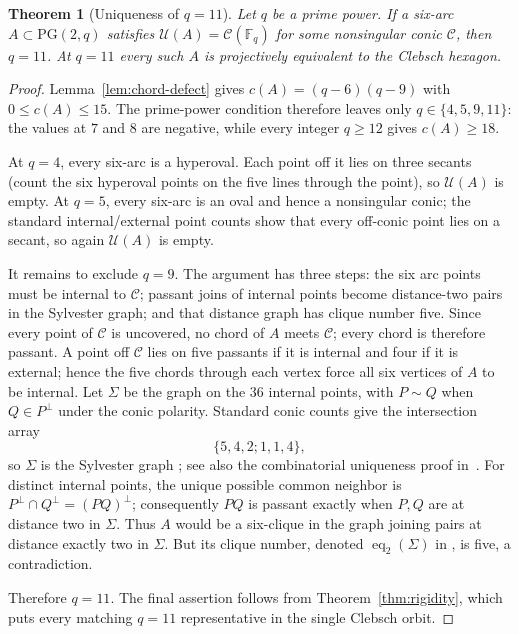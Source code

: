 \documentclass[11pt]{article}
\newtheorem{theorem}{Theorem}[section]
\theoremstyle{definition}
\theoremstyle{remark}
\newcommand{\PG}{\mathrm{PG}}
\newcommand{\F}{\mathbb{F}}
\newcommand{\cC}{\mathcal{C}}
\newcommand{\cU}{\mathcal{U}}
\begin{document}
\begin{theorem}[Uniqueness of $q=11$]
\label{thm:why11}
Let $q$ be a prime power. If a six-arc $A\subset\PG(2,q)$ satisfies
$\cU(A)=\cC(\F_q)$ for some nonsingular conic $\cC$, then $q=11$.
At $q=11$ every such $A$ is projectively equivalent to the
Clebsch hexagon.
\end{theorem}

\begin{proof}
Lemma~\ref{lem:chord-defect} gives
$c(A)=(q-6)(q-9)$ with $0\le c(A)\le15$. The prime-power condition therefore
leaves only $q\in\{4,5,9,11\}$: the values at $7$ and $8$ are negative,
while every integer $q\ge12$ gives $c(A)\ge18$.

At $q=4$, every six-arc is a hyperoval. Each point off it lies on three
secants (count the six hyperoval points on the five lines through the
point), so $\cU(A)$ is empty. At $q=5$, every six-arc is an oval and hence a
nonsingular conic; the standard internal/external point counts show that
every off-conic point lies on a secant, so again $\cU(A)$ is empty.

It remains to exclude $q=9$. The argument has three steps: the six arc
points must be internal to $\cC$; passant joins of internal points become
distance-two pairs in the Sylvester graph; and that distance graph has
clique number five. Since every point of $\cC$ is uncovered, no chord of
$A$ meets $\cC$; every chord is therefore passant. A point off $\cC$ lies on five passants if it
is internal and four if it is external; hence the five chords through each
vertex force all six vertices of $A$ to be internal. Let $\Sigma$ be the graph
on the $36$ internal points, with $P\sim Q$ when $Q\in P^\perp$ under the
conic polarity. Standard conic counts give the intersection array
\[
 \{5,4,2;1,1,4\},
\]
so $\Sigma$ is the Sylvester graph
\cite[\S13.1.2]{BrouwerCohenNeumaier1989}; see also the combinatorial
uniqueness proof in~\cite[Thm.~6]{JurisicVidali2019}. For distinct internal
points, the unique possible common neighbor is
$P^\perp\cap Q^\perp=(PQ)^\perp$; consequently $PQ$ is passant exactly when
$P,Q$ are at distance two in $\Sigma$. Thus $A$ would be a six-clique in the
graph joining pairs at distance exactly two in $\Sigma$. But its clique number, denoted
$\operatorname{eq}_2(\Sigma)$ in
\cite[Table~1]{AbiadJabalAmeliReijnders2025}, is five, a contradiction.

Therefore $q=11$. The final assertion follows from
Theorem~\ref{thm:rigidity}, which puts every matching $q=11$ representative
in the single Clebsch orbit.
\end{proof}
\end{document}
